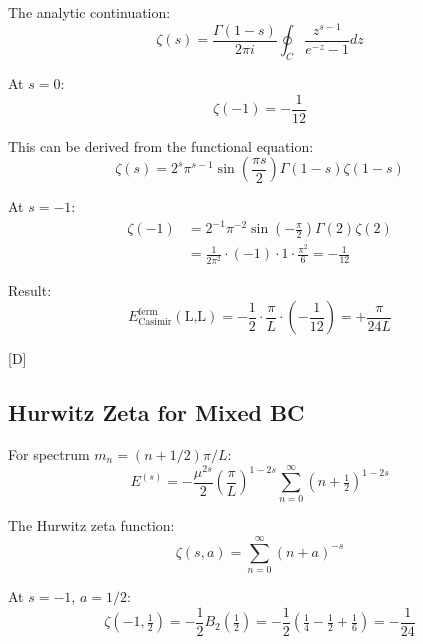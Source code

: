 \documentclass[11pt,a4paper]{article}
\newcommand{\tagD}{\textcolor{blue!70!black}{[D]}}
\begin{document}
The analytic continuation:
\begin{equation}
\label{eq:app-zeta-cont}
\zeta(s) = \frac{\Gamma(1-s)}{2\pi i} \oint_C \frac{z^{s-1}}{e^{-z} - 1} dz
\end{equation}

At $s = 0$:
\begin{equation}
\label{eq:app-zeta-val}
\zeta(-1) = -\frac{1}{12}
\end{equation}

This can be derived from the functional equation:
\begin{equation}
\label{eq:app-zeta-func-eq}
\zeta(s) = 2^s \pi^{s-1} \sin\left(\frac{\pi s}{2}\right) \Gamma(1-s) \zeta(1-s)
\end{equation}

At $s = -1$:
\begin{align}
\label{eq:app-zeta-m1-calc}
\zeta(-1) &= 2^{-1} \pi^{-2} \sin\left(-\frac{\pi}{2}\right) \Gamma(2) \zeta(2) \\
\label{eq:app-zeta-m1-eval}
&= \frac{1}{2\pi^2} \cdot (-1) \cdot 1 \cdot \frac{\pi^2}{6} = -\frac{1}{12}
\end{align}

Result:
\begin{equation}
\label{eq:app-casimir-result}
E_{\text{Casimir}}^{\text{ferm}}(\text{L,L}) = -\frac{1}{2} \cdot \frac{\pi}{L} \cdot (-\frac{1}{12})
= +\frac{\pi}{24L}
\end{equation}

\tagD

\subsection{Hurwitz Zeta for Mixed BC}

For spectrum $m_n = (n + 1/2)\pi/L$:
\begin{equation}
\label{eq:app-hurwitz-def}
E^{(s)} = -\frac{\mu^{2s}}{2} \left(\frac{\pi}{L}\right)^{1-2s} \sum_{n=0}^\infty (n + \tfrac{1}{2})^{1-2s}
\end{equation}

The Hurwitz zeta function:
\begin{equation}
\label{eq:app-hurwitz-zeta}
\zeta(s, a) = \sum_{n=0}^\infty (n + a)^{-s}
\end{equation}

At $s = -1$, $a = 1/2$:
\begin{equation}
\label{eq:app-hurwitz-m1-half}
\zeta(-1, \tfrac{1}{2}) = -\frac{1}{2} B_2(\tfrac{1}{2}) = -\frac{1}{2} \left(\tfrac{1}{4} - \tfrac{1}{2} + \tfrac{1}{6}\right) = -\frac{1}{24}
\end{equation}
\end{document}
